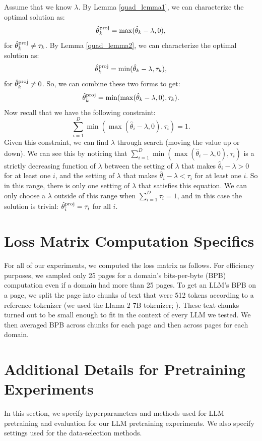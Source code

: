 \documentclass{article} %
\newcommand{\thproj}{\hat{\theta}^{\textnormal{proj}}}
\begin{document}
Assume that we know $\lambda$. By Lemma \ref{quad_lemma1}, we can characterize the optimal solution as:
\[
\thproj_k = \max(\hat{\theta}_k - \lambda, 0),
\]
for $\thproj_k \neq \tau_k$. By Lemma \ref{quad_lemma2}, we can characterize the optimal solution as:
\[
\thproj_k = \min(\hat{\theta}_k - \lambda, \tau_k),
\]
for $\thproj_k \neq 0$. So, we can combine these two forms to get:
\[
\thproj_k = \min(\max(\hat{\theta}_k - \lambda, 0), \tau_k).
\]
Now recall that we have the following constraint:
\[
\sum_{i=1}^D \min(\max(\hat{\theta}_i - \lambda, 0), \tau_i) = 1.
\]
Given this constraint, we can find $\lambda$ through search (moving the value up or down). We can see this by noticing that $\sum_{i=1}^D \min(\max(\hat{\theta}_i - \lambda, 0), \tau_i)$ is a strictly decreasing function of $\lambda$ between the setting of $\lambda$ that makes $\hat{\theta}_i - \lambda>0$ for at least one $i$, and the setting of $\lambda$ that makes $\hat{\theta}_i - \lambda<\tau_i$ for at least one $i$. So in this range, there is only one setting of $\lambda$ that satisfies this equation. We can only choose a $\lambda$ outside of this range when $\sum_{i=1}^D \tau_i = 1$, and in this case the solution is trivial: $\thproj_i=\tau_i$ for all $i$.

\section{Loss Matrix Computation Specifics}
\label{app:loss_computation}

For all of our experiments, we computed the loss matrix as follows. For efficiency purposes, we sampled only 25 pages for a domain's bits-per-byte (BPB) computation even if a domain had more than 25 pages. To get an LLM's BPB on a page, we split the page into chunks of text that were 512 tokens according to a reference tokenizer (we used the Llama 2 7B tokenizer; \citealt{llama2}). These text chunks turned out to be small enough to fit in the context of every LLM we tested. We then averaged BPB across chunks for each page and then across pages for each domain. 

\section{Additional Details for Pretraining Experiments}
\label{pretraining_experiment_details}

In this section, we specify hyperparameters and methods used for LLM pretraining and evaluation for our LLM pretraining experiments. We also specify settings used for the data-selection methods.
\end{document}
